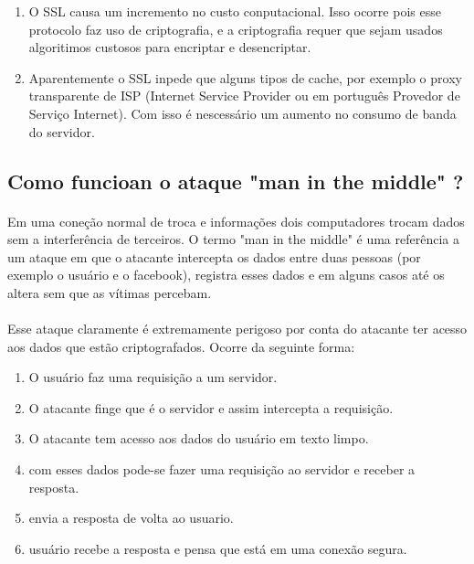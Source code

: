 \documentclass{article}
\begin{document}
  \begin{enumerate}
    \item O SSL causa um incremento no custo conputacional. Isso ocorre pois
    esse protocolo faz uso de criptografia, e a criptografia requer que sejam
    usados algoritimos custosos para encriptar e desencriptar.
    \item Aparentemente o SSL inpede que alguns tipos de cache, por exemplo o
    proxy transparente de ISP (Internet Service Provider ou em português
    Provedor de Serviço Internet). Com isso é nescessário um aumento no consumo
    de banda do servidor.
  \end{enumerate}

  \subsection{Como funcioan o ataque "man in the middle" ?}
  \paragraph{}
    Em uma coneção normal de troca e informações dois computadores trocam dados
  sem a interferência de terceiros. O termo "man in the middle" é uma referência
  a um ataque em que o atacante intercepta os dados entre duas pessoas (por
  exemplo o usuário e o facebook), registra esses dados e em alguns casos até
  os altera sem que as vítimas percebam.
  \paragraph{}
    Esse ataque claramente é extremamente perigoso por conta do atacante ter
  acesso aos dados que estão criptografados. Ocorre da seguinte forma:

  \begin{enumerate}
    \item O usuário faz uma requisição a um servidor.
    \item O atacante finge que é o servidor e assim intercepta a requisição.
    \item O atacante tem acesso aos dados do usuário em texto limpo.
    \item com esses dados pode-se fazer uma requisição ao servidor e receber
    a resposta.
    \item envia a resposta de volta ao usuario.
    \item usuário recebe a resposta e pensa que está em uma conexão segura.
  \end{enumerate}
\end{document}
